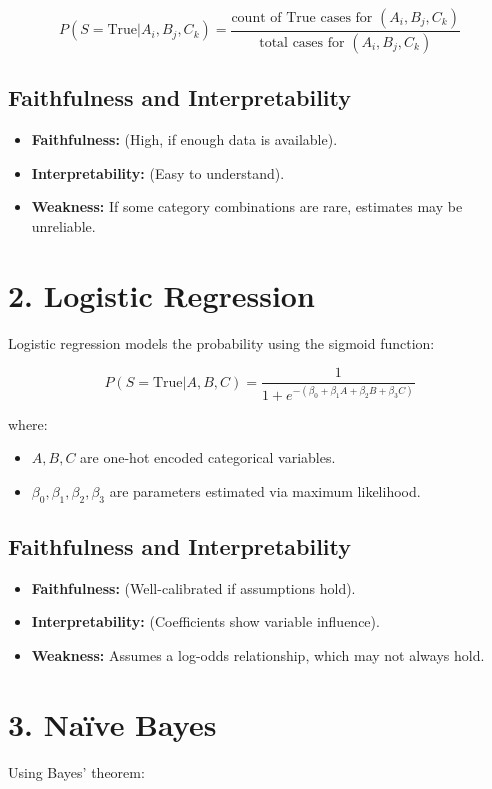 \documentclass{article}
\begin{document}
\[
P(S = \text{True} | A_i, B_j, C_k) = \frac{\text{count of True cases for } (A_i, B_j, C_k)}{\text{total cases for } (A_i, B_j, C_k)}
\]

\subsection{Faithfulness and Interpretability}
\begin{itemize}
    \item \textbf{Faithfulness:}  (High, if enough data is available).
    \item \textbf{Interpretability:}  (Easy to understand).
    \item \textbf{Weakness:} If some category combinations are rare, estimates may be unreliable.
\end{itemize}

\section{2. Logistic Regression}
Logistic regression models the probability using the sigmoid function:

\[
P(S = \text{True} | A, B, C) = \frac{1}{1 + e^{-(\beta_0 + \beta_1 A + \beta_2 B + \beta_3 C)}}
\]

where:
\begin{itemize}
    \item \( A, B, C \) are one-hot encoded categorical variables.
    \item \( \beta_0, \beta_1, \beta_2, \beta_3 \) are parameters estimated via maximum likelihood.
\end{itemize}

\subsection{Faithfulness and Interpretability}
\begin{itemize}
    \item \textbf{Faithfulness:}  (Well-calibrated if assumptions hold).
    \item \textbf{Interpretability:}  (Coefficients show variable influence).
    \item \textbf{Weakness:} Assumes a log-odds relationship, which may not always hold.
\end{itemize}

\section{3. Naïve Bayes}
Using Bayes' theorem:
\end{document}
